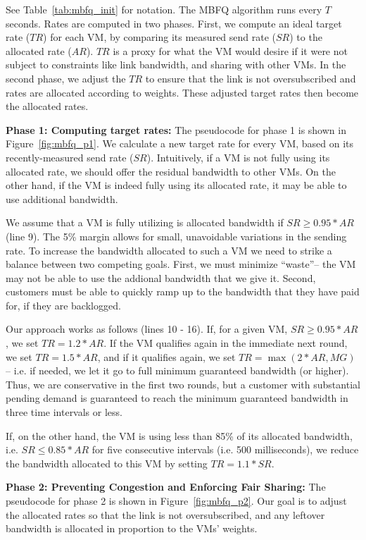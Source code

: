 See Table~\ref{tab:mbfq_init} for notation.  The MBFQ algorithm runs every $T$
seconds. Rates are computed in two phases.  First, we compute an ideal target
rate ($TR$) for each VM, by comparing its measured send rate ($SR$) to the
allocated rate ($AR$). $TR$ is a proxy for what the VM would desire if it were
not subject to constraints like link bandwidth, and sharing with other VMs.  In
the second phase, we adjust the $TR$ to ensure that the link is not
oversubscribed and rates are allocated according to weights. These adjusted
target rates then become the allocated rates.

{\bf Phase 1: Computing target rates:} 
The pseudocode for phase 1 is shown in Figure~\ref{fig:mbfq_p1}. We calculate
a new target rate for every VM, based on its recently-measured send rate ($SR$).
Intuitively, if a VM is not fully using its allocated rate, we should offer the
residual bandwidth to other VMs.  On the other hand, if the VM is indeed fully
using its allocated rate, it may be able to use additional bandwidth. 

We assume that a VM is fully utilizing is allocated bandwidth if $SR \geq
0.95*AR$ (line 9). The 5\% margin allows for small, unavoidable variations in
the sending rate. To increase the bandwidth allocated to such a VM we need to
strike a balance between two competing goals. First, we must minimize
``waste''-- the VM may not be able to use the addional bandwidth that we give
it.  Second, customers must be able to quickly ramp up to the bandwidth that
they have paid for, if they are backlogged.

Our approach works as follows (lines 10 - 16).  If, for a given VM, $SR \geq
0.95*AR$, we set $TR = 1.2*AR$.  If the VM qualifies again in the immediate next
round, we set $TR = 1.5*AR$, and if it qualifies again, we set $TR = \max(2*AR,
MG)$ -- i.e.  if needed, we let it go to full minimum guaranteed bandwidth (or
higher).  Thus, we are conservative in the first two rounds, but a customer with
substantial pending demand is guaranteed to reach the minimum guaranteed
bandwidth in three time intervals or less.

If, on the other hand, the VM is using less than 85\% of its allocated
bandwidth, i.e. $SR \leq 0.85*AR$ for five consecutive intervals (i.e. 500 milliseconds),
we reduce the bandwidth allocated to this VM by setting $TR = 1.1*SR$. 

{\bf Phase 2:  Preventing Congestion and Enforcing Fair Sharing:} The pseudocode
for phase 2 is shown in Figure~\ref{fig:mbfq_p2}. Our goal is to adjust the
allocated rates so that the link is not oversubscribed, and any leftover bandwidth
is allocated in proportion to the VMs' weights.


